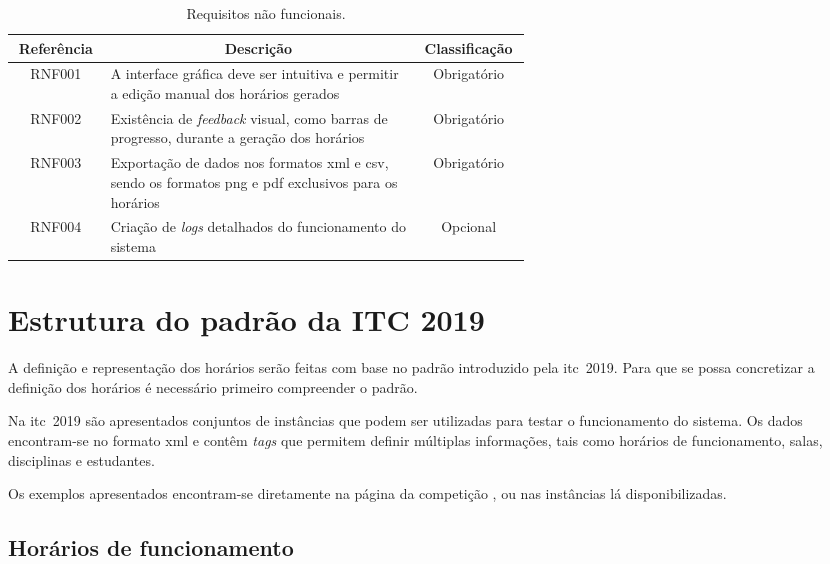 {
\setlength{\tabcolsep}{.8em}
\begin{table}[htbp]
    \centering
    \caption{Requisitos não funcionais.}
    \label{tabela:requisitos-nao-funcionais}
    \begin{tabular}{c p{0.6\linewidth} c}
        \toprule
        \textbf{Referência} & \multicolumn{1}{c}{\textbf{Descrição}} & \textbf{Classificação} \\ \midrule
        RNF001     & A interface gráfica deve ser intuitiva e permitir a edição manual dos horários gerados   & Obrigatório   \\ \midrule
        RNF002     & Existência de \textit{feedback} visual, como barras de progresso, durante a geração dos horários & Obrigatório   \\ \midrule
        RNF003 &
        Exportação de dados nos formatos \gls{xml} e \gls{csv}, sendo os formatos \gls{png} e \gls{pdf} exclusivos para os horários &
        Obrigatório \\ \midrule
        RNF004     & Criação de \textit{logs} detalhados do funcionamento do sistema                          & Opcional      \\ \bottomrule
    \end{tabular}
\end{table}
}

\section{Estrutura do padrão da ITC 2019}
\label{capitulo3:Padrao-itc2019}

A definição e representação dos horários serão feitas com base no padrão introduzido pela \gls{itc}~2019. Para que se possa concretizar a definição dos horários é necessário primeiro compreender o padrão.

Na \gls{itc}~2019 são apresentados conjuntos de instâncias que podem ser utilizadas para testar o funcionamento do sistema. Os dados encontram-se no formato \gls{xml} e contêm \textit{tags} que permitem definir múltiplas informações, tais como horários de funcionamento, salas, disciplinas e estudantes.

Os exemplos apresentados encontram-se diretamente na página da competição \cite{itc2019-Website}, ou nas instâncias lá disponibilizadas.

\subsection{Horários de funcionamento}

